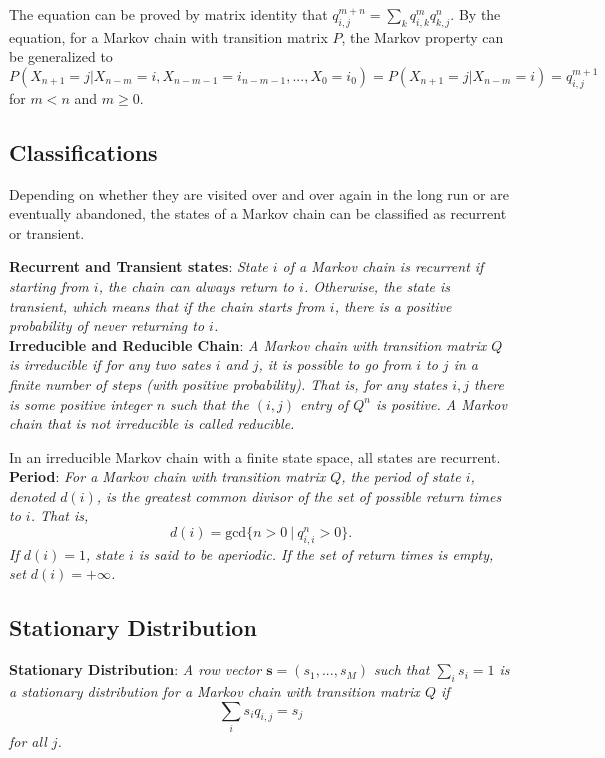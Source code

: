 \documentclass{progartcn}
\begin{document}
			The equation can be proved by matrix identity that $q^{m+n}_{i,j}=\sum_{k}q^m_{i,k}q^n_{k,j}$. By the equation, for a Markov chain with transition matrix $P$, the Markov property can be generalized to
			\[P(X_{n+1}=j|X_{n-m}=i, X_{n-m-1}=i_{n-m-1}, ..., X_0=i_0)=P(X_{n+1}=j|X_{n-m}=i)=q^{m+1}_{i,j}\]
			for $m<n$ and $m\ge0$.\\

	\subsection{Classifications}

			Depending on whether they are visited over and over again in the long run or are eventually abandoned, the states of a Markov chain can be classified as recurrent or transient.

			\textbf{Recurrent and Transient states}: \textit{State $i$ of a Markov chain is recurrent if starting from $i$, the chain can always return to $i$. Otherwise, the state is transient, which means that if the chain starts from $i$, there is a positive probability of never returning to $i$.}\\

			\textbf{Irreducible and Reducible Chain}: \textit{A Markov chain with transition matrix $Q$ is irreducible if for any two sates $i$ and $j$, it is possible to go from $i$ to $j$ in a finite number of steps (with positive probability). That is, for any states $i,j$ there is some positive integer $n$ such that the $(i,j)$ entry of $Q^{n}$ is positive. A Markov chain that is not irreducible is called reducible.}

			In an irreducible Markov chain with a finite state space, all states are recurrent.\\

			\textbf{Period}: \textit{For a Markov chain with transition matrix $Q$, the period of state $i$, denoted $d(i)$, is the greatest common divisor of the set of possible return times to $i$. That is,}
			\[d(i)=\text{gcd}\{n>0\ |\ q_{i,i}^{n}>0\}.\]
			\textit{If $d(i)=1$, state $i$ is said to be aperiodic. If the set of return times is empty, set $d(i)=+\infty$.}\\

	\subsection{Stationary Distribution}

			\textbf{Stationary Distribution}: \textit{A row vector $\mathbf{s}=(s_1,...,s_M)$ such that $\sum_i s_i=1$ is a stationary distribution for a Markov chain with transition matrix $Q$ if}
			\[\sum_i s_i q_{i,j}=s_j\]
			\textit{for all $j$.}
\end{document}
